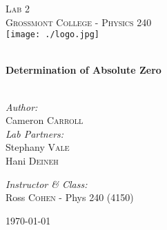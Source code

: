 \begin{titlepage}
\begin{center}

\textsc{\Large Lab 2}\\[1.5cm]
\textsc{\Large Grossmont College - Physics 240}\\[0.5cm]
\texttt{[image: ./logo.jpg]}

\HRule \\[0.4cm]
{ \LARGE \bfseries Determination of Absolute Zero}\\[0.5cm]

\HRule \\[1.5cm]

\begin{minipage}{0.4\textwidth}
\begin{flushleft} \large
\emph{Author:}\\
Cameron \textsc{Carroll}\\[0.2cm]
\emph{Lab Partners:}\\
Stephany  \textsc{Vale}\\
Hani \textsc{Deineh}\\

\end{flushleft}
\end{minipage}
\begin{minipage}{0.4\textwidth}
\begin{flushright} \large
\emph{Instructor \& Class:}\\
Ross \textsc{Cohen} - Phys 240 (4150)
\end{flushright}
\end{minipage}

\vfill

{\large \today}

\end{center}
\end{titlepage}